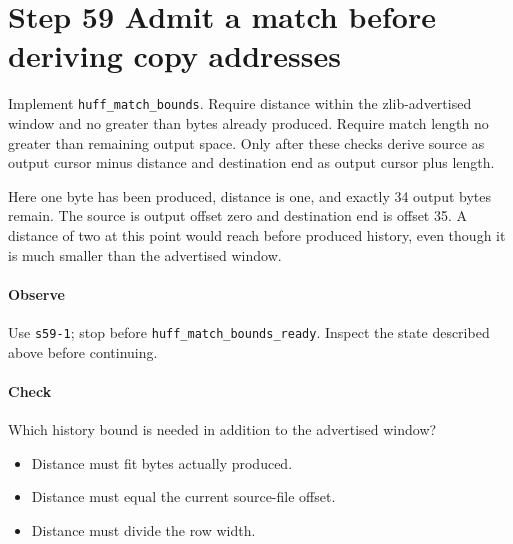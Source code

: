 \section{Step 59 Admit a match before deriving copy addresses}\label{png-huff-s59}
Implement \texttt{huff\_match\_bounds}. Require distance within the zlib-advertised window and no greater than bytes already produced. Require match length no greater than remaining output space. Only after these checks derive source as output cursor minus distance and destination end as output cursor plus length.

Here one byte has been produced, distance is one, and exactly 34 output bytes remain. The source is output offset zero and destination end is offset 35. A distance of two at this point would reach before produced history, even though it is much smaller than the advertised window.

\paragraph{Observe} Use \texttt{s59-1}; stop before \texttt{huff\_match\_bounds\_ready}. Inspect the state described above before continuing.

\paragraph{Check} Which history bound is needed in addition to the advertised window?
\begin{itemize}
  \item[A.] Distance must fit bytes actually produced.
  \item[B.] Distance must equal the current source-file offset.
  \item[C.] Distance must divide the row width.
\end{itemize}

